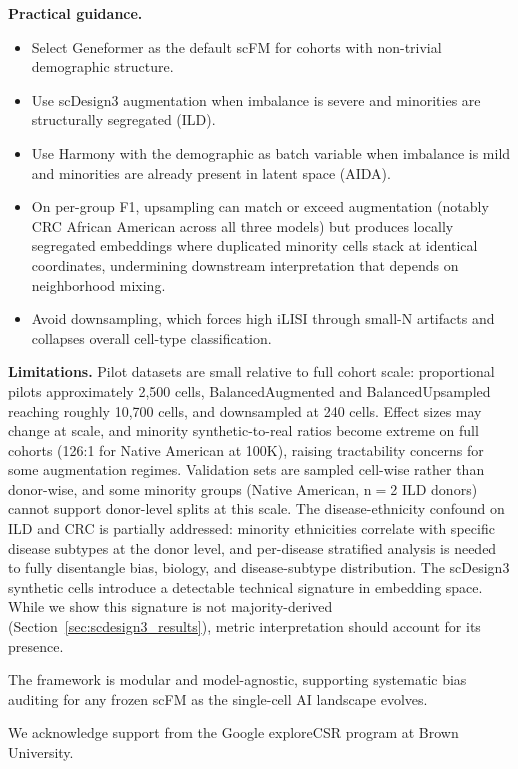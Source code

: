 \documentclass[sigconf]{acmart}
\begin{document}
\textbf{Practical guidance.}
\begin{itemize}
\item Select Geneformer as the default scFM for cohorts with non-trivial demographic structure.
\item Use scDesign3 augmentation when imbalance is severe and minorities are structurally segregated (ILD).
\item Use Harmony with the demographic as batch variable when imbalance is mild and minorities are already present in latent space (AIDA).
\item On per-group F1, upsampling can match or exceed augmentation (notably CRC African American across all three models) but produces locally segregated embeddings where duplicated minority cells stack at identical coordinates, undermining downstream interpretation that depends on neighborhood mixing.
\item Avoid downsampling, which forces high iLISI through small-N artifacts and collapses overall cell-type classification.
\end{itemize}

\textbf{Limitations.} Pilot datasets are small relative to full cohort scale: proportional pilots approximately 2{,}500 cells, BalancedAugmented and BalancedUpsampled reaching roughly 10{,}700 cells, and downsampled at 240 cells. Effect sizes may change at scale, and minority synthetic-to-real ratios become extreme on full cohorts (126:1 for Native American at 100K), raising tractability concerns for some augmentation regimes. Validation sets are sampled cell-wise rather than donor-wise, and some minority groups (Native American, n$=$2 ILD donors) cannot support donor-level splits at this scale. The disease-ethnicity confound on ILD and CRC is partially addressed: minority ethnicities correlate with specific disease subtypes at the donor level, and per-disease stratified analysis is needed to fully disentangle bias, biology, and disease-subtype distribution. The scDesign3 synthetic cells introduce a detectable technical signature in embedding space. While we show this signature is not majority-derived (Section~\ref{sec:scdesign3_results}), metric interpretation should account for its presence.

The framework is modular and model-agnostic, supporting systematic bias auditing for any frozen scFM as the single-cell AI landscape evolves.

\begin{acks}

We acknowledge support from the Google exploreCSR program at Brown University.

\end{acks}
\end{document}
